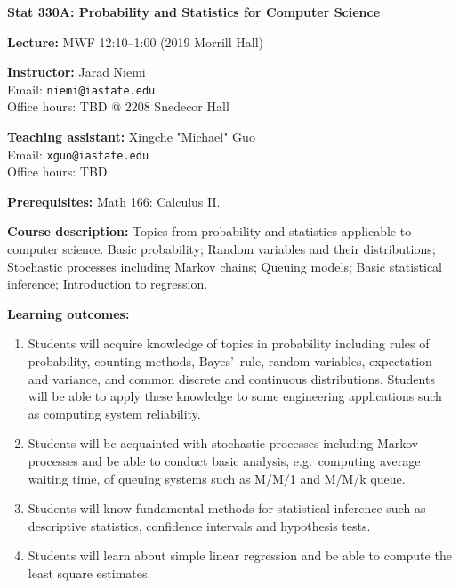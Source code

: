 \documentclass[10pt]{article}
\newcommand{\sep}{\vspace*{0.4cm}}
\newcommand{\tab}{\hspace*{0.8cm}}
\begin{document}
\pagestyle{fancy}

%



\begin{center}
\textbf{\large Stat 330A: Probability and Statistics for Computer Science}
\end{center}
\sep

\textbf{Lecture:} MWF 12:10--1:00 (2019 Morrill Hall)
\sep

\textbf{Instructor:} 
Jarad Niemi\\
\tab Email: {\tt niemi@iastate.edu}\\
\tab Office hours: TBD @ 2208 Snedecor Hall
\sep

\textbf{Teaching assistant:}
Xingche "Michael" Guo\\
\tab Email: {\tt xguo@iastate.edu}\\
\tab Office hours: TBD
\sep

\textbf{Prerequisites:} Math 166: Calculus II. 
\sep

\textbf{Course description:}
Topics from probability and statistics applicable to computer science. 
Basic probability; Random variables and their distributions; 
Stochastic processes including Markov chains; Queuing models; 
Basic statistical inference; Introduction to regression.
\sep

\textbf{Learning outcomes:}
\begin{enumerate}
  \item Students will acquire knowledge of topics in probability
    including rules of probability, counting methods, Bayes'~rule, random variables,
    expectation and variance, and common discrete and continuous distributions.
    Students will be able to apply these knowledge to some engineering
    applications such as computing system reliability.
  \item Students will be acquainted with stochastic processes including Markov processes and be able to
    conduct basic analysis, e.g.~computing average waiting time, 
    of queuing systems such as M/M/1 and M/M/k queue.
  \item Students will know fundamental methods for statistical inference such as descriptive statistics, confidence intervals and hypothesis tests.
  \item Students will learn about simple linear regression and be able to
    compute the least square estimates.
  \end{enumerate}
  \sep
\end{document}
